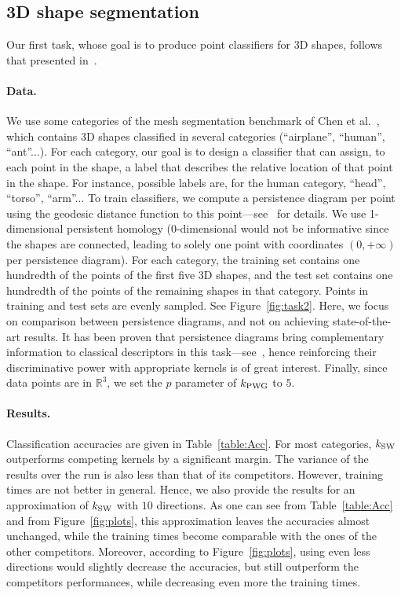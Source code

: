 \documentclass[11pt]{article}
\newcommand{\R}{\mathbb{R}}
\newcommand{\kPWG}{k_{\rm PWG}}
\newcommand{\kSW}{k_{\rm SW}}
\begin{document}
\subsection{3D shape segmentation}
Our first task, whose goal is to produce point classifiers for 3D shapes, follows that presented in~\cite{Carriere15a}.

\paragraph*{Data.}  We use some categories of the mesh segmentation benchmark of Chen et al.~\cite{Chen09},
which contains 3D shapes classified in several categories (``airplane'', ``human'', ``ant''...).
For each category, our goal is to design a classifier that can assign, to each point in the shape,
a label that describes the relative location of that point in the shape. For instance, possible labels are, for the human category, 
``head'', ``torso'', ``arm''...
To train classifiers, we compute a persistence diagram per point using the geodesic distance function to this point---see~\cite{Carriere15a} for details.
We use 1-dimensional persistent homology (0-dimensional would not be informative since the shapes are connected,
leading to solely one point with coordinates $(0,+\infty)$ per persistence diagram). 
For each category, the training set contains one hundredth of the points of the first five 3D shapes,
and the test set contains one hundredth of the points of the remaining shapes in that category. Points in
training and test sets are evenly sampled. See Figure~\ref{fig:task2}.
Here, we focus on comparison between persistence diagrams, and not
on achieving state-of-the-art results. It has been proven that persistence diagrams bring complementary information
to classical descriptors in this task---see~\cite{Carriere15a}, 
hence reinforcing their discriminative power with appropriate kernels is of great interest.
Finally, since data points are in $\R^3$, we set the $p$ parameter of $\kPWG$ to $5$. 

\paragraph*{Results.} Classification accuracies are given in Table~\ref{table:Acc}.
For most categories, $\kSW$ outperforms competing kernels by a significant margin.
The variance of the results over the run is also less than that of its competitors. 
However, training times are not better in general. 
Hence, we also provide the results for an approximation of $\kSW$ with $10$ directions.
As one can see from Table~\ref{table:Acc} and from Figure~\ref{fig:plots}, this approximation leaves the accuracies almost unchanged, 
while the training times become comparable with the ones of the other competitors. Moreover, 
according to Figure~\ref{fig:plots}, using even less directions
would slightly decrease the accuracies, but still outperform the competitors performances,
while decreasing even more the training times. 
\end{document}
